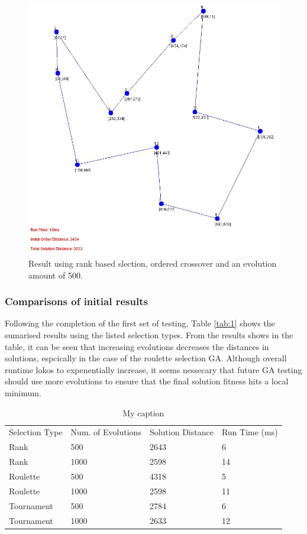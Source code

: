 \documentclass[article]{IEEEtran}
\begin{document}
\begin{figure}[H]
\centering
  \includegraphics[width=.9\linewidth]{images/ordered_tournament_015_1000_true}
  \caption{Result using rank based slection, ordered crossover and an evolution amount of 500.}
  \label{fig:13}
\end{figure}

\subsubsection{Comparisons of initial results}
Following the completion of the first set of testing, Table \ref{tab:1} shows the sumarised results using the listed selection types. From the results shows in the table, it can be seen that increasing evolutions decreases the distances in solutions, espcically in the case of the roulette selection GA. Although overall runtime lokos to expenentially increase, it seems nessecary that future GA testing should use more evolutions to ensure that the final solution fitness hits a local minimum.

\begin{table}[H]
\centering
\caption{My caption}
\label{my-label}
\begin{tabular}{llll}
Selection Type & Num. of Evolutions & Solution Distance & Run Time (ms) \\
Rank           & 500                & 2643              & 6             \\
Rank           & 1000               & 2598              & 14            \\
Roulette       & 500                & 4318              & 5             \\
Roulette       & 1000               & 2598              & 11            \\
Tournament     & 500                & 2784              & 6             \\
Tournament     & 1000               & 2633              & 12           
\end{tabular}
\end{table}
\end{document}
